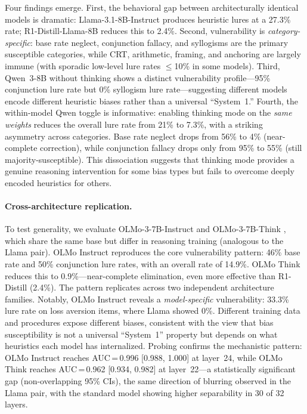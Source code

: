 \documentclass[accepted]{article}
\begin{document}
Four findings emerge.  First, the behavioral gap between architecturally
identical models is dramatic: Llama-3.1-8B-Instruct produces heuristic
lures at a 27.3\% rate; R1-Distill-Llama-8B reduces this to 2.4\%.
Second, vulnerability is \emph{category-specific}: base rate neglect,
conjunction fallacy, and syllogisms are the primary susceptible categories,
while CRT, arithmetic, framing, and anchoring are largely immune
(with sporadic low-level lure rates $\leq$10\% in some models).  Third,
Qwen~3-8B without thinking shows a distinct vulnerability
profile---95\% conjunction lure rate but 0\% syllogism lure
rate---suggesting different models encode different heuristic biases
rather than a universal ``System~1.''  Fourth, the within-model Qwen
toggle is informative: enabling thinking mode on the \emph{same weights}
reduces the overall lure rate from 21\% to 7.3\%, with a striking
asymmetry across categories.  Base rate neglect drops from 56\% to 4\%
(near-complete correction), while conjunction fallacy drops only from
95\% to 55\% (still majority-susceptible).  This dissociation suggests
that thinking mode provides a genuine reasoning intervention for some
bias types but fails to overcome deeply encoded heuristics for others.

\paragraph{Cross-architecture replication.}
To test generality, we evaluate OLMo-3-7B-Instruct and
OLMo-3-7B-Think \citep{olmo3}, which share the same base but differ in
reasoning training (analogous to the Llama pair).  OLMo Instruct
reproduces the core vulnerability pattern: 46\% base rate and 50\%
conjunction lure rates, with an overall rate of 14.9\%.  OLMo Think
reduces this to 0.9\%---near-complete elimination, even more effective
than R1-Distill (2.4\%).  The pattern replicates across two independent
architecture families.  Notably, OLMo Instruct reveals a
\emph{model-specific} vulnerability: 33.3\% lure rate on loss aversion
items, where Llama showed 0\%.  Different training data and procedures
expose different biases, consistent with the view that bias
susceptibility is not a universal ``System~1'' property but depends on
what heuristics each model has internalized.  Probing confirms the mechanistic pattern: OLMo Instruct reaches AUC\,=\,0.996 [0.988, 1.000] at layer~24, while OLMo Think reaches AUC\,=\,0.962 [0.934, 0.982] at layer~22---a statistically significant gap (non-overlapping 95\% CIs), the same direction of blurring observed in the Llama pair, with the standard model showing higher separability in 30 of 32 layers.
\end{document}
